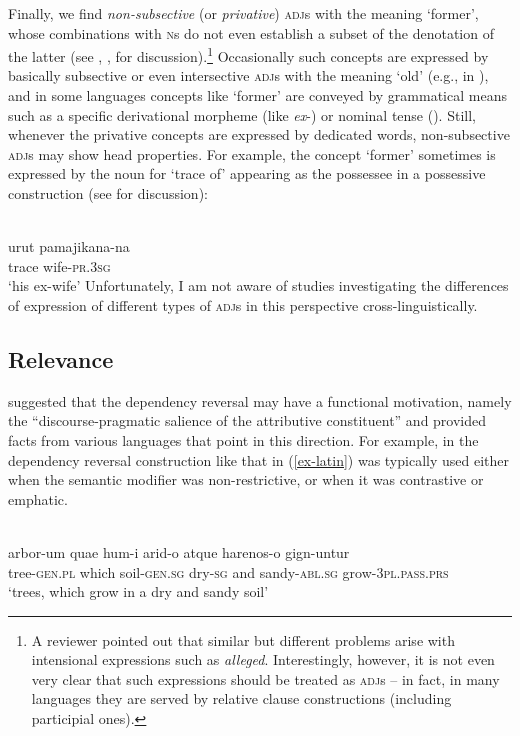 \documentclass[output=paper,nobabel,draftmode  ,colorlinks, citecolor=brown]{langscibook}
\begin{document}
Finally, we find \emph{non-subsective} (or \emph{privative}) \textsc{adj}s with the meaning `former', whose combinations with
\textsc{n}s do not even establish a subset of the denotation of the latter (see \cite{Kamp1975}, \cite{KampPartee1995}, \cite{Partee2010} for discussion).\footnote{A reviewer pointed out that similar but different problems arise with intensional expressions such as \emph{alleged}. Interestingly, however, it is not even very clear that such expressions should be treated as \textsc{adj}s – in fact, in many languages they are served by relative clause constructions (including participial ones).} Occasionally such concepts are expressed by basically subsective or even intersective \textsc{adj}s with the meaning `old' (e.g., in ), and in some languages concepts like `former' are conveyed by grammatical means such as a specific derivational morpheme (like  \emph{ex}-) or nominal tense (\cite{NordlingerSadler2004}). Still, whenever the privative concepts are expressed by dedicated words, non-subsective \textsc{adj}s may show head properties. For example, the concept `former' sometimes is expressed by the noun for `trace of' appearing as the possessee in a possessive construction (see \citealt{Lander2009} for discussion):

\ea 
{}\\
\gll urut 	pamajikana-na \\ 	
     trace	wife-\textsc{pr.3sg} \\
\glt `his ex-wife'
\z
Unfortunately, I am not aware of studies investigating the differences of expression of different types of \textsc{adj}s in this perspective cross-linguistically.

\subsection{Relevance}\label{sec-relevance}

\citet*[55]{Malchukov2000} suggested that the dependency reversal may have a functional motivation, namely the ``discourse-pragmatic salience of the attributive constituent'' and provided facts from various languages that point in this direction. For example, in  the dependency reversal construction like that in (\ref{ex-latin}) was typically used either when the semantic modifier was non-restrictive, or when it was contrastive or emphatic. 


\ea\label{ex-latin} 
\\
\gll  arbor-um	quae	hum-i		arid-o atque harenos-o	gign-untur \\ 
      tree-\textsc{gen.pl} which soil-\textsc{gen.sg}	dry-\textsc{sg}	and	sandy-\textsc{abl.sg} grow-\textsc{3pl.pass.prs} \\
\glt `trees, which grow in a dry and sandy soil'
\z
\end{document}
